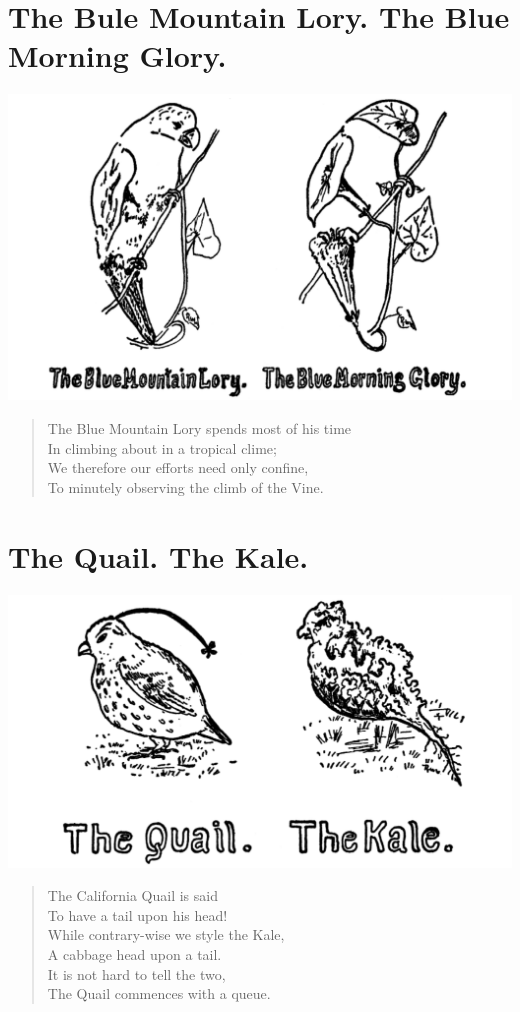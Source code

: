 \documentclass[letterpaper, 10pt, openany]{memoir}
\begin{document}
\chapter{The Bule Mountain Lory. The Blue Morning Glory.}
\includegraphics[width=1\textwidth]{f-p15.png}
\vspace{\onelineskip}
\begin{verse}\huge
The Blue Mountain Lory spends most of his time\\
In climbing about in a tropical clime;\\
We therefore our efforts need only confine,\\
To minutely observing the climb of the Vine.\\
\end{verse}

\chapter{The Quail. The Kale.}
\includegraphics[width=1\textwidth]{f-p16.png}
\vspace{\onelineskip}
\begin{verse}\huge
The California Quail is said\\
To have a tail upon his head!\\
While contrary-wise we style the Kale,\\
A cabbage head upon a tail.\\
It is not hard to tell the two,\\
The Quail commences with a queue.\\
\end{verse}
\end{document}
